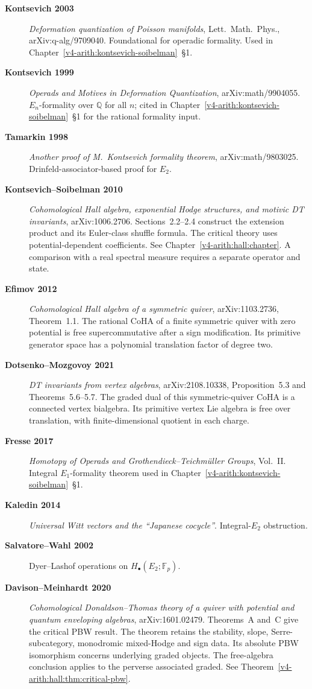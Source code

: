 \begin{description}
\item[\textbf{Kontsevich 2003}] \emph{Deformation quantization of
Poisson manifolds}, Lett.~Math.~Phys., arXiv:q-alg/9709040.
Foundational for operadic formality. Used in
Chapter~\ref{v4-arith:kontsevich-soibelman}~\S1.
\item[\textbf{Kontsevich 1999}] \emph{Operads and Motives in
Deformation Quantization}, arXiv:math/9904055. \(E_{n}\)-formality
over \(\mathbb{Q}\) for all \(n\); cited in
Chapter~\ref{v4-arith:kontsevich-soibelman}~\S1 for the rational
formality input.
\item[\textbf{Tamarkin 1998}] \emph{Another proof of M.~Kontsevich
formality theorem}, arXiv:math/9803025. Drinfeld-associator-based
proof for \(E_{2}\).
\item[\textbf{Kontsevich--Soibelman 2010}] \emph{Cohomological Hall
algebra, exponential Hodge structures, and motivic DT invariants},
arXiv:1006.2706. Sections~2.2--2.4 construct the extension product
and its Euler-class shuffle formula. The critical theory uses
potential-dependent coefficients. See
Chapter~\ref{v4-arith:hall:chapter}. A comparison with a real spectral
measure requires a separate operator and state.
\item[\textbf{Efimov 2012}] \emph{Cohomological Hall algebra of
a symmetric quiver}, arXiv:1103.2736, Theorem~1.1. The rational
CoHA of a finite symmetric quiver with zero potential is free
supercommutative after a sign modification. Its primitive generator
space has a polynomial translation factor of degree two.
\item[\textbf{Dotsenko--Mozgovoy 2021}] \emph{DT invariants from
vertex algebras}, arXiv:2108.10338, Proposition~5.3 and
Theorems~5.6--5.7. The graded dual of this symmetric-quiver CoHA
is a connected vertex bialgebra. Its primitive vertex Lie algebra
is free over translation, with finite-dimensional quotient in
each charge.
\item[\textbf{Fresse 2017}] \emph{Homotopy of Operads and
Grothendieck--Teichm\"uller Groups}, Vol.~II.
Integral \(E_{1}\)-formality theorem used in
Chapter~\ref{v4-arith:kontsevich-soibelman}~\S1.
\item[\textbf{Kaledin 2014}] \emph{Universal Witt vectors and the
``Japanese cocycle''}. Integral-\(E_{2}\)
obstruction.
\item[\textbf{Salvatore--Wahl 2002}]
Dyer--Lashof operations on \(H_{\bullet}(E_{2};\mathbb{F}_{p})\).
\item[\textbf{Davison--Meinhardt 2020}] \emph{Cohomological
Donaldson--Thomas theory of a quiver with potential and quantum
enveloping algebras}, arXiv:1601.02479. Theorems~A and~C give the critical PBW result.
The theorem retains the stability, slope,
Serre-subcategory, monodromic mixed-Hodge and sign data.
Its absolute PBW isomorphism concerns underlying graded objects.
The free-algebra conclusion applies to the perverse associated
graded. See Theorem~\ref{v4-arith:hall:thm:critical-pbw}.
\end{description}

